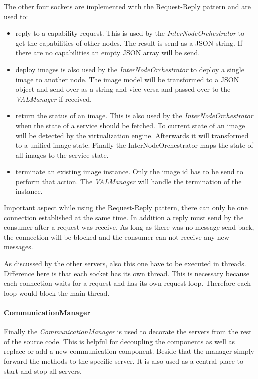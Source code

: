 The other four sockets are implemented with the Request-Reply pattern and are used to:
\begin{itemize}
  \item reply to a capability request.
  This is used by the \textit{InterNodeOrchestrator} to get the capabilities of other nodes.
  The result is send as a \ac{JSON} string.
  If there are no capabilities an empty \ac{JSON} array will be send.
  \item deploy images is also used by the \textit{InterNodeOrchestrator} to deploy a single image to another node.
  The image model will be transformed to a \ac{JSON} object and send over as a string and vice versa and passed over to the \textit{VALManager} if received.
  \item return the status of an image. This is also used by the \textit{InterNodeOrchestrator} when the state of a service should be fetched. To current state of an image will be detected by the virtualization engine. Afterwards it will transformed to a unified image state. Finally the InterNodeOrchestrator maps the state of all images to the service state.
  \item terminate an existing image instance.
  Only the image id has to be send to perform that action.
  The \textit{VALManager} will handle the termination of the instance.
\end{itemize}
\bigskip

Important aspect while using the Request-Reply pattern, there can only be one connection established at the same time.
In addition a reply must send by the consumer after a request was receive.
As long as there was no message send back, the connection will be blocked and the consumer can not receive any new messages.\newline

As discussed by the other servers, also this one have to be executed in threads.
Difference here is that each socket has its own thread.
This is necessary because each connection waits for a request and has its own request loop.
Therefore each loop would block the main thread.

\paragraph{CommunicationManager}
Finally the \textit{CommunicationManager} is used to decorate the servers from the rest of the source code.
This is helpful for decoupling the components as well as replace or add a new communication component.
Beside that the manager simply forward the methods to the specific server.
It is also used as a central place to start and stop all servers.


